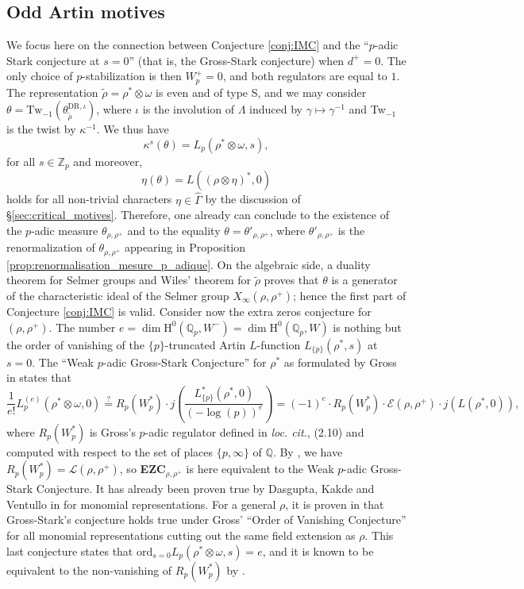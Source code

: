 \documentclass[12pt]{amsart}
\newcommand\bQ{\mathbb{Q}}
\newcommand\Zp{{\mathbb{Z}_p}}
\newcommand\Qp{{\mathbb{Q}_p}}
\newcommand\cE{\mathcal{E}}
\newcommand\cL{\mathcal{L}}
\newcommand{\ord}{\mathrm{ord}}
\newcommand{\HH}{\mathrm{H}}
\newcommand{\DR}{\mathrm{DR}}
\theoremstyle{defstyle}
\theoremstyle{thmstyle}
\begin{document}
\subsection{Odd Artin motives}\label{sec:exemple_odd_motives}
We focus here on the connection between Conjecture \ref{conj:IMC} and the ``$p$-adic Stark conjecture at $s=0$'' (that is, the Gross-Stark conjecture) when $d^+=0$. The only choice of $p$-stabilization is then $W_p^+=0$, and both regulators are equal to $1$. The representation $\widetilde{\rho}=\rho^*\otimes\omega$ is even and of type S, and we may consider $\theta=\textrm{Tw}_{-1}(\theta_{\widetilde{\rho}}^{\DR,\iota})$, where $\iota$ is the involution of $\Lambda$ induced by $\gamma\mapsto \gamma^{-1}$ and  Tw$_{-1}$ is the twist by $\kappa^{-1}$. We thus have
$$\kappa^s(\theta)=L_p(\rho^*\otimes\omega,s),$$
for all $s\in\Zp$ and moreover, 
$$\eta(\theta)= L((\rho\otimes\eta)^*,0)$$
holds for all non-trivial characters $\eta\in\widehat{\Gamma}$ by the discussion of \S\ref{sec:critical_motives}. Therefore, one already can conclude to the existence of the $p$-adic measure $\theta_{\rho,\rho^+}$ and to the equality $\theta=\theta'_{\rho,\rho^+}$, where $\theta'_{\rho,\rho^+}$ is the renormalization of $\theta_{\rho,\rho^+}$ appearing in Proposition \ref{prop:renormalisation_mesure_p_adique}. On the algebraic side, a duality theorem for Selmer groups \cite[Thm. 2]{greenberg1989iwasawa} and Wiles' theorem for $\widetilde{\rho}$ proves that $\theta$ is a generator of the characteristic ideal of the Selmer group $X_\infty(\rho,\rho^+)$; hence the first part of Conjecture \ref{conj:IMC} is valid. Consider now the extra zeros conjecture for $(\rho,\rho^+)$. The number $e=\dim\HH^0(\Qp,W^-)=\dim\HH^0(\Qp,W)$ is nothing but the order of vanishing of the $\{p\}$-truncated Artin $L$-function $L_{\{p\}}(\rho^*,s)$ at $s=0$. The ``Weak $p$-adic Gross-Stark Conjecture'' for $\rho^*$ as formulated by Gross in \cite[Conjecture 2.12b)]{gross1981padic} states that
$$\frac{1}{e!}L_p^{(e)}(\rho^*\otimes\omega,0)\overset{?}{=}R_p(W_p^*)\cdot j\left( \frac{L^*_{\{p\}}(\rho^*,0)}{(-\log(p))^e}\right)=(-1)^e\cdot R_p(W_p^*)\cdot\cE(\rho,\rho^+)\cdot j\left(L(\rho^*,0)\right),$$
where $R_p(W_p^*)$ is Gross's $p$-adic regulator defined in \textit{loc. cit.}, (2.10) and computed with respect to the set of places $\{p,\infty\}$ of $\bQ$. By \cite[\S3.1]{maksouddimitrov}, we have $R_p(W_p^*)=\cL(\rho,\rho^+)$, so \textbf{EZC}$_{\rho,\rho^+}$ is here equivalent to the Weak $p$-adic Gross-Stark Conjecture. It has already been proven true by Dasgupta, Kakde and Ventullo in \cite{dasguptakakdeventullo} for monomial representations. For a general $\rho$, it is proven in \cite[Thm. 2.6]{burnsOnderivativesofpadicLseriesats0} that Gross-Stark's conjecture holds true under Gross' ``Order of Vanishing Conjecture'' \cite[Conj. 2.12a)]{gross1981padic} for all monomial representations cutting out the same field extension as $\rho$. This last conjecture states that $\ord_{s=0}L_p(\rho^*\otimes\omega,s)=e$, and it is known to be equivalent to the non-vanishing of $R_p(W_p^*)$ by \cite[Thm. 3.1 (i)-(iii)]{burnsOnderivativesofpadicLseriesats0}.
\end{document}
